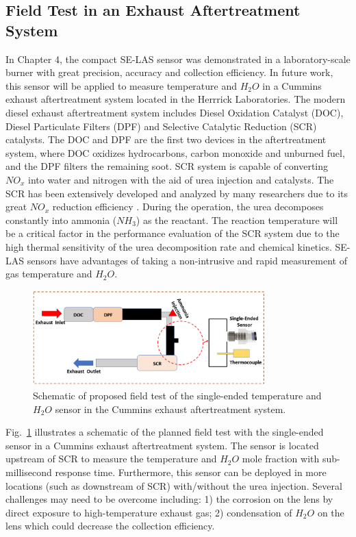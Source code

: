 \subsection{Field Test in an Exhaust Aftertreatment System}
In Chapter 4, the compact SE-LAS sensor was demonstrated in a laboratory-scale burner with great precision, accuracy and collection efficiency. In future work, this sensor will be applied to measure temperature and $H_2O$ in a Cummins exhaust aftertreatment system located in the Herrrick Laboratories. The modern diesel exhaust aftertreatment system includes Diesel Oxidation Catalyst (DOC), Diesel Particulate Filters (DPF) and Selective Catalytic Reduction (SCR) catalysts. The DOC and DPF are the first two devices in the aftertreatment system, where DOC oxidizes hydrocarbons, carbon monoxide and unburned fuel, and the DPF filters the remaining soot. SCR system is capable of converting $NO_x$ into water and nitrogen with the aid of urea injection and catalysts. The SCR has been extensively developed and analyzed by many researchers due to its great $NO_x$ reduction efficiency \cite{asif2015urea,southern1993demonstration,recsitouglu2015pollutant,GUAN2014395,doi:10.1177/0142331216656754,qi2003performance,saito2003development,muzio2002overview,gieshoff2000improved,sluder2005low,lei2013influence}. During the operation, the urea decomposes constantly into ammonia ($NH_3$) as the reactant. The reaction temperature will be a critical factor in the performance evaluation of the SCR system due to the high thermal sensitivity of the urea decomposition rate and chemical kinetics. SE-LAS sensors have advantages of taking a non-intrusive and rapid measurement of gas temperature and $H_2O$.

 \begin{figure}[ht]
    \centering       
    \includegraphics[width=0.8\textwidth]{fig/ch5_fig1.PNG}
        \caption{Schematic of proposed field test of the single-ended temperature and $H_2O$ sensor in the Cummins exhaust aftertreatment system.}
    \label{fig:ch5_1}
\end{figure}

Fig.\ \ref{fig:ch5_1} illustrates a schematic of the planned field test with the single-ended sensor in a Cummins exhaust aftertreatment system. The sensor is located upstream of SCR to measure the temperature and $H_2O$ mole fraction with sub-millisecond response time. Furthermore, this sensor can be deployed in more locations (such as downstream of SCR) with/without the urea injection. Several challenges may need to be overcome including: 1) the corrosion on the lens by direct exposure to high-temperature exhaust gas; 2) condensation of $H_2O$ on the lens which could decrease the collection efficiency. 
 
